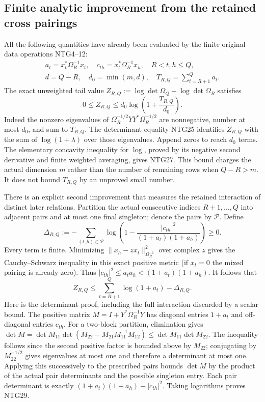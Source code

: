 \subsection{Finite analytic improvement from the retained cross pairings}
All the following quantities have already been evaluated by
the finite original-data operations NTG4--12:
\[
\begin{gathered}
 a_t=x_t^*\Omega_R^{-1}x_t,\quad
 c_{th}=x_t^*\Omega_R^{-1}x_h,\quad R<t,h\le Q,\\
 d=Q-R,\quad d_0=\min(m,d),\quad
 T_{R,Q}=\sum_{t=R+1}^Qa_t .
\end{gathered}                                                    \tag{NTG26}
\]
The exact unweighted tail value $Z_{R,Q}:=
\log\det\Omega_Q-\log\det\Omega_R$ satisfies
\[
 0\le Z_{R,Q}\le
 d_0\log\left(1+\frac{T_{R,Q}}{d_0}\right).
                                                               \tag{NTG27}
\]
Indeed the nonzero eigenvalues of
$\Omega_R^{-1/2}YY^*\Omega_R^{-1/2}$ are nonnegative,
number at most $d_0$, and sum to $T_{R,Q}$.
The determinant equality NTG25 identifies $Z_{R,Q}$
with the sum of $\log(1+\lambda)$ over those eigenvalues.
Append zeros to reach $d_0$ terms. The elementary
concavity inequality for $\log$, proved by its negative
second derivative and finite weighted averaging, gives
NTG27. This bound charges the actual dimension $m$ rather
than the number of remaining rows when $Q-R>m$.
It does not bound $T_{R,Q}$ by an unproved small number.

There is an explicit second improvement that measures
the retained interaction of distinct later relations.
Partition the actual consecutive indices $R+1,\ldots,Q$
into adjacent pairs and at most one final singleton;
denote the pairs by $\mathscr P$. Define
\[
 \Delta_{R,Q}:=
 -\sum_{(t,h)\in\mathscr P}
       \log\left(1-
         \frac{|c_{th}|^2}{(1+a_t)(1+a_h)}\right)\ge0 .
                                                               \tag{NTG28}
\]
Every term is finite. Minimizing
$\|x_h-zx_t\|_{\Omega_R^{-1}}^2$ over complex $z$ gives
the Cauchy--Schwarz inequality in this exact positive metric
(if $x_t=0$ the mixed pairing is already zero). Thus
$|c_{th}|^2\le a_ta_h<(1+a_t)(1+a_h)$.
It follows that
\[
 Z_{R,Q}\le
       \sum_{t=R+1}^{Q}\log(1+a_t)-\Delta_{R,Q}.
                                                               \tag{NTG29}
\]
Here is the determinant proof, including the full interaction
discarded by a scalar bound. The positive matrix
$M=I+Y^*\Omega_R^{-1}Y$ has diagonal entries $1+a_t$
and off-diagonal entries $c_{th}$. For a two-block
partition, elimination gives
$\det M=\det M_{11}\det(M_{22}-M_{21}M_{11}^{-1}M_{12})
\le\det M_{11}\det M_{22}$.
The inequality follows since the second positive factor
is bounded above by $M_{22}$; conjugating by
$M_{22}^{-1/2}$ gives eigenvalues at most one and
therefore a determinant at most one. Applying this
successively to the prescribed pairs bounds $\det M$
by the product of the actual pair determinants and
the possible singleton entry. Each pair determinant
is exactly $(1+a_t)(1+a_h)-|c_{th}|^2$.
Taking logarithms proves NTG29.

